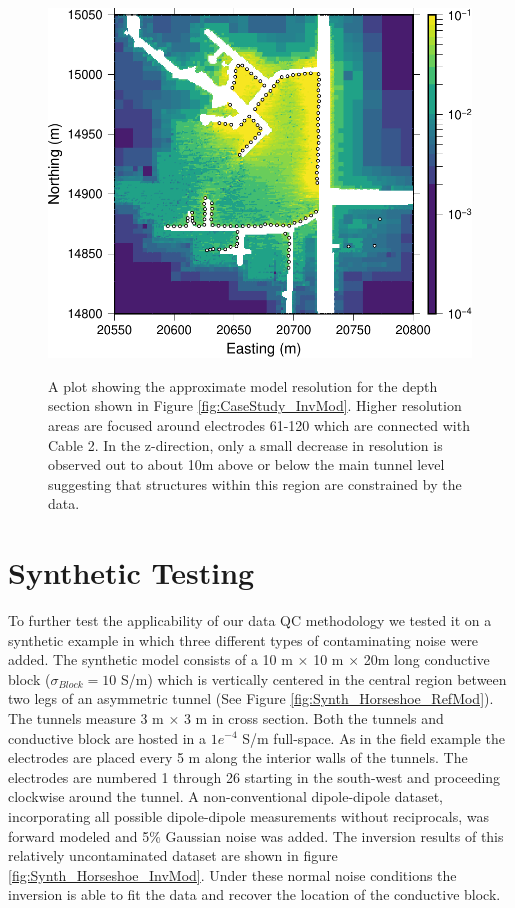 \documentclass[final,authoryear,5p,times,twocolumn]{elsarticle}
\begin{document}
\begin{figure} [!ht]
    \begin{center}
       \label{fig:ModRes_CableSplitCombined_Final_z2586}
       \includegraphics[trim=0cm 0cm 0cm 0cm, clip=true,width=0.95\linewidth]{./Figures/Fig19.pdf}
    \end{center}
\caption{A plot showing the approximate model resolution for the depth section shown in Figure \ref{fig:CaseStudy_InvMod}. Higher resolution areas are focused around electrodes 61-120 which are connected with Cable 2. In the z-direction, only a small decrease in resolution is observed out to about 10m above or below the main tunnel level suggesting that structures within this region are constrained by the data.}
\label{fig:ModRes_CableSplitCombined_Final}
\end{figure}

\section{Synthetic Testing}
\label{Synthetic_Testing}

To further test the applicability of our data QC methodology we tested it on a synthetic example in which three different types of contaminating noise were added. The synthetic model consists of a 10 m $\times$ 10 m $\times$ 20m long conductive block ($\sigma_{Block}= 10$ S/m) which is vertically centered in the central region between two legs of an asymmetric tunnel (See Figure \ref{fig:Synth_Horseshoe_RefMod}). The tunnels measure 3 m $\times$ 3 m in cross section. Both the tunnels and conductive block are hosted in a $1e^{-4}$ S/m full-space. As in the field example the electrodes are placed every 5 m along the interior walls of the tunnels. The electrodes are numbered 1 through 26 starting in the south-west and proceeding clockwise around the tunnel. A non-conventional dipole-dipole dataset, incorporating all possible dipole-dipole measurements without reciprocals, was forward modeled and 5\% Gaussian noise was added. The inversion results of this relatively uncontaminated dataset are shown in figure \ref{fig:Synth_Horseshoe_InvMod}. Under these normal noise conditions the inversion is able to fit the data and recover the location of the conductive block.
\end{document}
